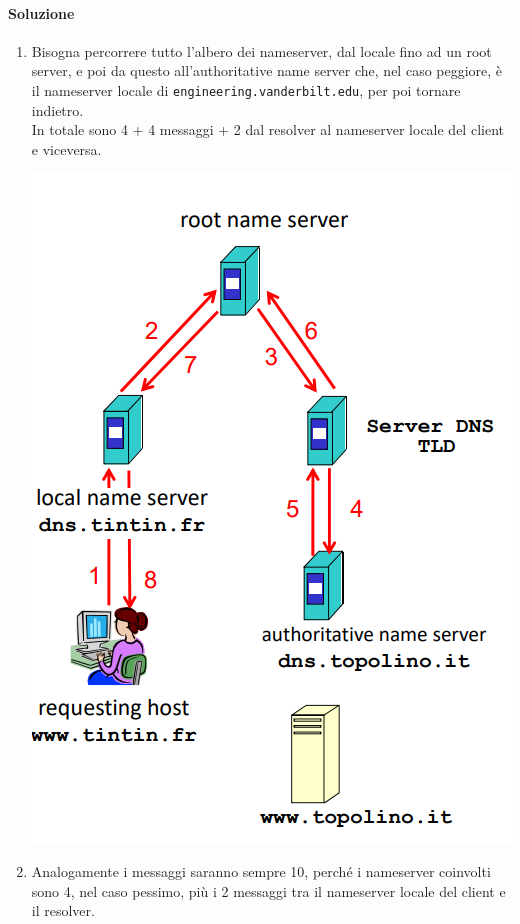 \documentclass[10pt]{article}
\begin{document}
\paragraph{Soluzione}
\begin{multicols}{2}
\begin{enumerate}
\item Bisogna percorrere tutto l'albero dei nameserver, dal locale fino ad un root server, e poi da questo all'authoritative name server che, nel caso peggiore, è il nameserver locale di \texttt{engineering.vanderbilt.edu}, per poi tornare indietro.\\
In totale sono 4 + 4 messaggi + 2 dal resolver al nameserver locale del client e viceversa.\begin{center}
\includegraphics[scale=0.3]{dnsqueryricorsiva.png}
\end{center}
\item Analogamente i messaggi saranno sempre 10, perché i nameserver coinvolti sono 4, nel caso pessimo, più i 2 messaggi tra il nameserver locale del client e il resolver.

\end{enumerate}
\end{multicols}
\end{document}
